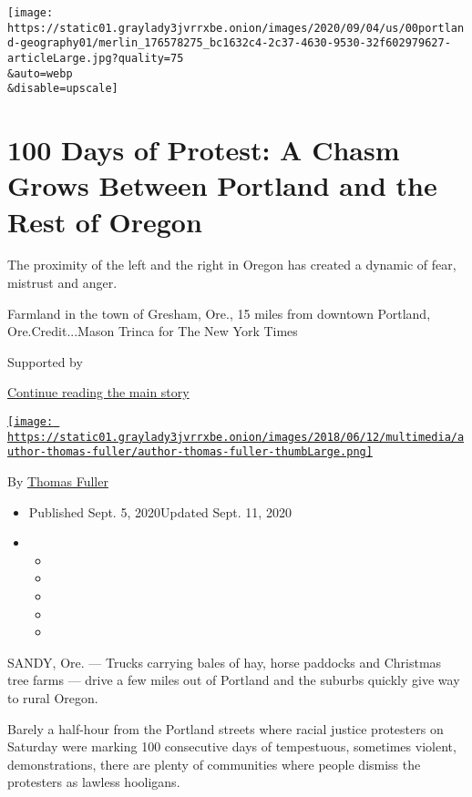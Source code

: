 \texttt{[image: https://static01.graylady3jvrrxbe.onion/images/2020/09/04/us/00portland-geography01/merlin\_176578275\_bc1632c4-2c37-4630-9530-32f602979627-articleLarge.jpg?quality=75\\\&auto=webp\\\&disable=upscale]}

\hypertarget{100-days-of-protest-a-chasm-grows-between-portland-and-the-rest-of-oregon}{%
\section{100 Days of Protest: A Chasm Grows Between Portland and the
Rest of
Oregon}\label{100-days-of-protest-a-chasm-grows-between-portland-and-the-rest-of-oregon}}

The proximity of the left and the right in Oregon has created a dynamic
of fear, mistrust and anger.

Farmland in the town of Gresham, Ore., 15 miles from downtown Portland,
Ore.Credit...Mason Trinca for The New York Times

Supported by

\protect\hyperlink{after-sponsor}{Continue reading the main story}

\href{https://www.nytimes3xbfgragh.onion/by/thomas-fuller}{\texttt{[image: https://static01.graylady3jvrrxbe.onion/images/2018/06/12/multimedia/author-thomas-fuller/author-thomas-fuller-thumbLarge.png]}}

By \href{https://www.nytimes3xbfgragh.onion/by/thomas-fuller}{Thomas
Fuller}

\begin{itemize}
\item
  Published Sept. 5, 2020Updated Sept. 11, 2020
\item
  \begin{itemize}
  \item
  \item
  \item
  \item
  \item
  \end{itemize}
\end{itemize}

SANDY, Ore. --- Trucks carrying bales of hay, horse paddocks and
Christmas tree farms --- drive a few miles out of Portland and the
suburbs quickly give way to rural Oregon.

Barely a half-hour from the Portland streets where racial justice
protesters on Saturday were marking 100 consecutive days of tempestuous,
sometimes violent, demonstrations, there are plenty of communities where
people dismiss the protesters as lawless hooligans.

